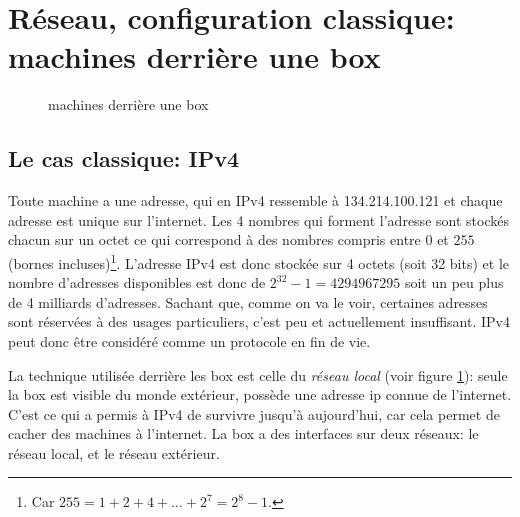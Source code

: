 \section{Réseau, configuration classique: machines derrière une \og
  box\fg}

\begin{figure}
  \caption{machines derrière une  \og   box\fg}\label{box}
\end{figure}

\subsection{Le cas \og classique\fg{}: IPv4}
Toute machine a une adresse, qui en IPv4 ressemble à
134.214.100.121 et chaque adresse est unique sur l'internet. Les 4 nombres 
qui forment l'adresse sont stockés chacun sur un octet ce qui
correspond à des nombres compris entre $0$ et $255$
(bornes incluses)\footnote{Car $255 = 1+2 +4+\ldots+2^7 = 2^8 -1$.}. L'adresse
IPv4 est donc stockée sur 4 octets (soit 32 bits)  et le nombre d'adresses
disponibles est donc de $2^{32} -1= 4294967295$ soit un peu plus de 4
milliards d'adresses. Sachant que, comme on va le voir, certaines
adresses sont réservées à des usages particuliers, c'est peu et
actuellement insuffisant. IPv4 peut donc être considéré comme un
protocole en fin de vie.

La technique utilisée derrière les  \og   box\fg{} est celle du
\emph{réseau local} (voir figure \ref{box}): seule la  \og   box\fg{}
est visible du monde extérieur, possède une adresse ip connue de
l'internet. C'est ce qui a permis à IPv4 de survivre jusqu'à
aujourd'hui, car cela permet de cacher des machines à l'internet.  La
\og   box\fg{} a des interfaces sur deux réseaux: le 
réseau local, et le réseau extérieur.
